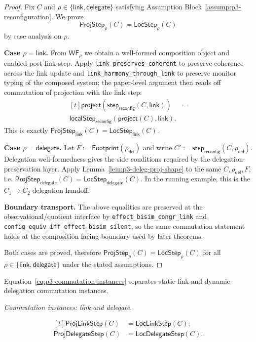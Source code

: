 \documentclass[a4paper,10pt,twocolumn,english]{article}
\numberwithin{equation}{section}
\theoremstyle{paperdef}
\theoremstyle{paperplain}
\theoremstyle{paperdef}
\theoremstyle{paperremark}
\theoremstyle{paperdef}
\newcommand{\ProjStep}[2]{\ensuremath{\mathsf{ProjStep}_{#2}(#1)}}
\newcommand{\LocStep}[2]{\ensuremath{\mathsf{LocStep}_{#2}(#1)}}
\newcommand{\ProjLink}[1]{\ensuremath{\mathsf{ProjLinkStep}(#1)}}
\newcommand{\LocLink}[1]{\ensuremath{\mathsf{LocLinkStep}(#1)}}
\newcommand{\ProjDelegate}[1]{\ensuremath{\mathsf{ProjDelegateStep}(#1)}}
\newcommand{\LocDelegate}[1]{\ensuremath{\mathsf{LocDelegateStep}(#1)}}
\newcommand{\eqnote}[1]{\par\noindent\textit{#1.}\par\vspace{2pt}}
\begin{document}
\begin{proof}
	Fix $C$ and $\rho\in\{\mathsf{link},\mathsf{delegate}\}$ satisfying
	Assumption Block~\ref{assump:p3-reconfiguration}. We prove
	\[
		\ProjStep{C}{\rho}=\LocStep{C}{\rho}
	\]
	by case analysis on $\rho$.

	\textbf{Case $\rho=\mathsf{link}$.}
	From $\mathsf{WF}_\rho$ we obtain a well-formed composition object and enabled post-link step.
	Apply \nolinkurl{link_preserves_coherent} to preserve coherence across the link update and
	\nolinkurl{link_harmony_through_link} to preserve monitor typing of the composed system; the
	paper-level argument then reads off commutation of projection with the link step:
	\[
		\begin{aligned}[t]
			\mathsf{project}(\mathsf{step}_{\mathsf{reconfig}}(C,\mathsf{link}))
			 & = \\
			\mathsf{localStep}_{\mathsf{reconfig}}(\mathsf{project}(C),\mathsf{link}).
		\end{aligned}
	\]
	This is exactly $\ProjStep{C}{\mathsf{link}}=\LocStep{C}{\mathsf{link}}$.

	\textbf{Case $\rho=\mathsf{delegate}$.}
	Let $F:=\mathsf{Footprint}(\rho_{\mathsf{del}})$ and write
	$C':=\mathsf{step}_{\mathsf{reconfig}}(C,\rho_{\mathsf{del}})$.
	Delegation well-formedness gives the side conditions required by the delegation-preservation layer.
	Apply Lemma~\ref{lem:p3-deleg-proj-shape} to the same $C,\rho_{\mathsf{del}},F$,
	i.e. $\ProjStep{C}{\mathsf{delegate}}=\LocStep{C}{\mathsf{delegate}}$.
	In the running example, this is the $C_1 \to C_2$ delegation handoff.

	\textbf{Boundary transport.}
	The above equalities are preserved at the observational/quotient interface by
	\nolinkurl{effect_bisim_congr_link} and
	\nolinkurl{config_equiv_iff_effect_bisim_silent}, so the same commutation statement holds at the
	composition-facing boundary used by later theorems.

	Both cases are proved, therefore $\ProjStep{C}{\rho}=\LocStep{C}{\rho}$ for all
	$\rho\in\{\mathsf{link},\mathsf{delegate}\}$ under the stated assumptions.
\end{proof}

Equation~\ref{eq:p3-commutation-instances} separates static-link and dynamic-delegation commutation instances.
\eqnote{Commutation instances: link and delegate}
\begin{equation}
	\label{eq:p3-commutation-instances}
	\begin{aligned}[t]
		\ProjLink{C}     & = \LocLink{C};     \\
		\ProjDelegate{C} & = \LocDelegate{C}.
	\end{aligned}
\end{equation}
\end{document}
